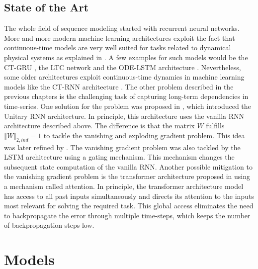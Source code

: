 \documentclass[draft,final]{vutinfth} %
\begin{document}
    \section{State of the Art}
    The whole field of sequence modeling started with recurrent neural networks.
    More and more modern machine learning architectures exploit the fact that continuous-time models are very well suited for tasks related to dynamical physical systems as explained in .
    A few examples for such models would be the CT-GRU \cite{CTGRU}, the LTC network \cite{LTCNetworks} and the ODE-LSTM architecture \cite{ODELSTM}.
    Nevertheless, some older architectures exploit continuous-time dynamics in machine learning models like the CT-RNN architecture \cite{CTRNN}.
    The other problem described in the previous chapters is the challenging task of capturing long-term dependencies in time-series.
    One solution for the problem was proposed in \cite{UnitaryRNNs}, which introduced the Unitary RNN architecture.
    In principle, this architecture uses the vanilla RNN architecture described above. The difference is that the matrix $W$ fulfills $\left\Vert W \right\Vert_{2,ind} = 1$ to tackle the vanishing and exploding gradient problem.
    This idea was later refined by \cite{EfficientUnitaryRNNs}.
    The vanishing gradient problem was also tackled by the LSTM architecture \cite{LSTM} using a gating mechanism.
    This mechanism changes the subsequent state computation of the vanilla RNN.
    Another possible mitigation to the vanishing gradient problem is the transformer architecture proposed in \cite{Transformer} using a mechanism called attention.
    In principle, the transformer architecture model has access to all past inputs simultaneously and directs its attention to the inputs most relevant for solving the required task.
    This global access eliminates the need to backpropagate the error through multiple time-steps, which keeps the number of backpropagation steps low.



    \chapter{Models}
\end{document}
